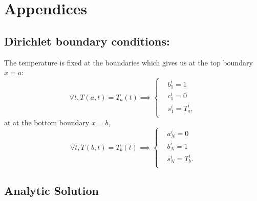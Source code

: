 
\section*{Appendices}

\subsection{Dirichlet boundary conditions:}
The temperature is fixed at the boundaries which gives us at the top boundary $x=a$:
\begin{equation}
    \forall t, T(a, t) = T_a(t) \implies
    \begin{cases}
        &b_1^i = 1 \\
        &c_1^i = 0 \\
        &s_1^i = T_a^i, \\
    \end{cases}  
\end{equation}
at at the bottom boundary $x=b$,
\begin{equation}
    \forall t, T(b, t) = T_b(t) \implies
    \begin{cases}
        &a_N^i = 0 \\
        &b_N^i = 1 \\
        &s_N^i = T_b^i. \\
    \end{cases}  
\end{equation}


\subsection{Analytic Solution}
\label{sup:ana}
